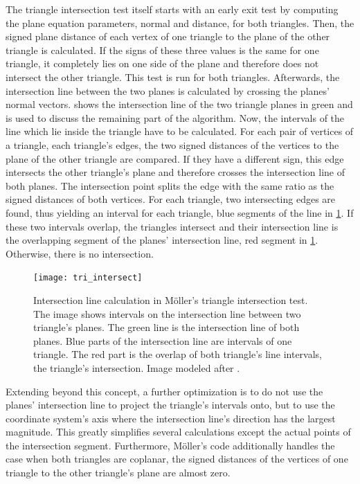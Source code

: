 The triangle intersection test itself starts with an early exit test by computing the plane equation parameters, \ie normal and distance, for both triangles.
Then, the signed plane distance of each vertex of one triangle to the plane of the other triangle is calculated.
If the signs of these three values is the same for one triangle, it completely lies on one side of the plane and therefore does not intersect the other triangle.
This test is run for both triangles.
Afterwards, the intersection line between the two planes is calculated by crossing the planes' normal vectors.
 shows the intersection line of the two triangle planes in green and is used to discuss the remaining part of the algorithm.
Now, the intervals of the line which lie inside the triangle have to be calculated.
For each pair of vertices of a triangle, \ie each triangle's edges, the two signed distances of the vertices to the plane of the other triangle are compared.
If they have a different sign, this edge intersects the other triangle's plane and therefore crosses the intersection line of both planes.
The intersection point splits the edge with the same ratio as the signed distances of both vertices.
For each triangle, two intersecting edges are found, thus yielding an interval for each triangle, \cf blue segments of the line in \cref{fig:tri_intersect}.
If these two intervals overlap, the triangles intersect and their intersection line is the overlapping segment of the planes' intersection line, \cf red segment in \cref{fig:tri_intersect}.
Otherwise, there is no intersection.

\begin{figure}
	\centering
	\texttt{[image: tri\_intersect]}
	\caption[Möller triangle-triangle intersection test]{
		Intersection line calculation in Möller's triangle intersection test.
		The image shows intervals on the intersection line between two triangle's planes.
		The green line is the intersection line of both planes.
		Blue parts of the intersection line are intervals of one triangle.
		The red part is the overlap of both triangle's line intervals, \ie the triangle's intersection.
		Image modeled after \cite[p757]{tri_tri_intersection_moller_image}.
	}
	\label{fig:tri_intersect}
\end{figure}

Extending beyond this concept, a further optimization is to do not use the planes' intersection line to project the triangle's intervals onto, but to use the coordinate system's axis where the intersection line's direction has the largest magnitude.
This greatly simplifies several calculations except the actual points of the intersection segment.
Furthermore, Möller's code additionally handles the case when both triangles are coplanar, \ie the signed distances of the vertices of one triangle to the other triangle's plane are almost zero.



